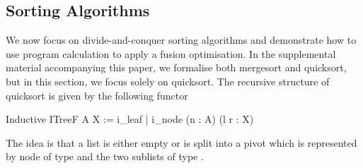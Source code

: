 \documentclass[a4paper,UKenglish,cleveref, autoref, thm-restate]{lipics-v2021}
\newcommand{\mvol}[1]{\textcolor{blue}{\textsc{Michael}: #1}}
\begin{document}
%
%

\subsection{Sorting Algorithms}\label{sec:sorting}
We now focus on divide-and-conquer sorting algorithms and demonstrate how to use
program calculation to apply a fusion optimisation. In the supplemental material
accompanying this paper, we formalise both mergesort and quicksort, but in this
section, we focus solely on quicksort. The recursive structure of quicksort is
given by the following functor
\begin{coqcode}
Inductive ITreeF A X := i_leaf | i_node (n : A) (l r : X)
\end{coqcode}
The idea is that a list is either empty or is split into a pivot which is
represented by node of type  and the two sublists of type .
\end{document}
